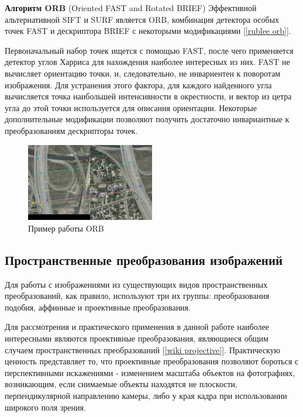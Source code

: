 {{		{\bf Алгоритм ORB} (Oriented FAST and Rotated BRIEF) Эффективной альтернативной SIFT и SURF является ORB, комбинация детектора особых точек FAST и дескриптора BRIEF с некоторыми модификациями [\ref{rublee orb}]. 
		
		Первоначальный набор точек ищется с помощью FAST, после чего применяется детектор углов Харриса для нахождения наиболее интересных из них. FAST не вычисляет ориентацию точки, и, следовательно, не инвариентен к поворотам изображения. Для устранения этого фактора, для каждого найденного угла вычисляется точка наибольшей интенсивности в окрестности, и вектор из цетра угла до этой точки используется для описания ориентации. Некоторые дополнительные модификации позволяют получить достаточно инвариантные к преобразованиям дескрипторы точек. 
		
		\begin{figure}[H]
			\centering                             
			\includegraphics[width=0.5\textwidth,keepaspectratio]{descriptors/orb.jpg}                 
			\centering\caption{ Пример работы ORB }
			\label{descriptors orb}                           
		\end{figure}    
		
}
\subsection{Пространственные преобразования изображений}{	
	Для работы с изображениями из существующих видов пространственных преобразований, как правило, используют три их группы: преобразования подобия, аффинные и проективные преобразования.
	
	Для рассмотрения и практического применения в данной работе наиболее интересными являются проективные преобразования, являющиеся общим случаем пространственных преобразований [\ref{wiki projective}]. Практическую ценность представляет то, что проективные преобразования позволяют бороться с перспективными искажениями - изменением масштаба объектов на фотографиях, возникающим, если снимаемые объекты находятся не плоскости, перпендикулярной направлению камеры, либо у края кадра при использовании широкого поля зрения.	
	
}}
